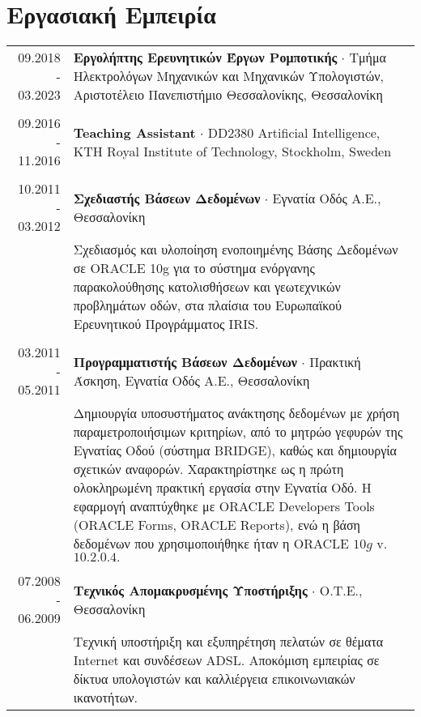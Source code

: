 \documentclass[a4paper,10pt,twoside]{article}
\begin{document}

\section{Εργασιακή Εμπειρία}

\begin{tabular}{rp{12cm}}
09.2018 - 03.2023 & \textbf{Εργολήπτης Ερευνητικών Έργων Ρομποτικής} $\cdot$ Τμήμα Ηλεκτρολόγων Μηχανικών και Μηχανικών Υπολογιστών, Αριστοτέλειο Πανεπιστήμιο Θεσσαλονίκης, Θεσσαλονίκη\\
&\\
09.2016 - 11.2016 & \textbf{Teaching Assistant} $\cdot$ DD2380 Artificial Intelligence, KTH Royal Institute of Technology, Stockholm, Sweden\\
&\\
10.2011 - 03.2012 & \textbf{Σχεδιαστής Βάσεων Δεδομένων} $\cdot$ Εγνατία Οδός Α.Ε., Θεσσαλονίκη \\
                  & Σχεδιασμός και υλοποίηση ενοποιημένης Βάσης Δεδομένων σε ORACLE 10g για
                    το σύστημα ενόργανης παρακολούθησης κατολισθήσεων και γεωτεχνικών προβλημάτων οδών,
                    στα πλαίσια του Ευρωπαϊκού Ερευνητικού Προγράμματος IRIS. \\
&\\
03.2011 - 05.2011 & \textbf{Προγραμματιστής Βάσεων Δεδομένων} $\cdot$ Πρακτική Άσκηση, Εγνατία Οδός Α.Ε., Θεσσαλονίκη \\
                  & Δημιουργία υποσυστήματος ανάκτησης δεδομένων με χρήση παραμετροποιήσιμων
                    κριτηρίων, από το μητρώο γεφυρών της Εγνατίας Οδού (σύστημα BRIDGE), καθώς και
                    δημιουργία σχετικών αναφορών. Χαρακτηρίστηκε ως η πρώτη ολοκληρωμένη πρακτική
                    εργασία στην Εγνατία Οδό. Η εφαρμογή αναπτύχθηκε με ORACLE Developers Tools
                    (ORACLE Forms, ORACLE Reports), ενώ η βάση δεδομένων που χρησιμοποιήθηκε ήταν η ORACLE $10g$ v. $10.2.0.4.$\\
&\\
07.2008 - 06.2009 & \textbf{Τεχνικός Απομακρυσμένης Υποστήριξης} $\cdot$ Ο.Τ.Ε., Θεσσαλονίκη\\
                  & Τεχνική υποστήριξη και εξυπηρέτηση πελατών σε θέματα Internet
                    και συνδέσεων ADSL. Αποκόμιση εμπειρίας σε δίκτυα υπολογιστών
                    και καλλιέργεια επικοινωνιακών ικανοτήτων.\\
\end{tabular} \\
\end{document}
